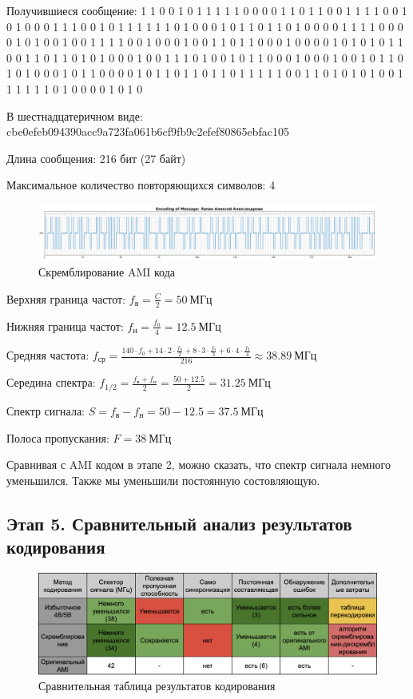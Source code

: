 \documentclass[12pt,onecolumn]{article}
\begin{document}
Получившиеся сообщение: 1 1 0 0 1 0 1 1 1 1 1 0 0 0 0 1 1 0 1 1 0 0 1 1 1 1 0 0 1 0 1 0 0 0 1 1 1
0 0 1 0 1 1 1 1 1 1 0 1 0 0 0 1 0 1 1 0 1 1 0 1 0 0 0 0 1 1 1 1 0 0 0 0 1
0 1 0 0 1 0 0 1 1 1 1 0 0 1 0 0 0 1 0 0 1 1 0 1 1 0 0 0 1 0 0 0 0 1 0 1 0
1 0 1 1 0 0 1 1 0 1 1 0 1 0 1 0 0 0 1 0 0 1 1 1 0 1 0 0 1 0 1 1 0 0 0 1 0
0 0 1 0 0 1 0 1 1 0 1 0 1 0 0 0 1 0 1 1 0 0 0 0 1 0 1 1 0 1 1 0 1 1 0 1 1
1 1 1 0 0 1 1 0 1 0 1 0 1 0 0 1 1 1 1 1 1 0 1 0 0 0 0 1 0 1 0

В шестнадцатеричном виде: cbe0efeb094390acc9a723fa061b6cf9fb9c2efef80865ebfac105

Длина сообщения: 216 бит (27 байт)

Максимальное количество повторяющихся символов: 4

\begin{figure}[H]
    \centering
    \includegraphics[width=\textwidth]{image/encoding_3-1.png}
    \caption{Скремблирование AMI кода}
\end{figure}

Верхняя граница частот: $f_{\text{в}} = \frac{C}{2} = 50~ \text{МГц}$

Нижняя граница частот: $f_{\text{н}} = \frac{f_0}{4} = 12.5 ~ \text{МГц}$

Средняя частота: $f_{\text{ср}} = \frac{140\cdot f_0 + 14\cdot 2\cdot \frac{f_0}{2} + 8\cdot3 \cdot \frac{f_0}{3} + 6 \cdot 4 \cdot\frac{f_0}{4}}{216} \approx 38.89~\text{МГц}$

Середина спектра: $f_{1/2} = \frac{f_{\text{в}} + f_{\text{н}}}{2} = \frac{50 + 12.5}{2} = 31.25~\text{МГц}$

Спектр сигнала: $S = f_{\text{в}} - f_{\text{н}} = 50 - 12.5 = 37.5~\text{МГц}$

Полоса пропускания: $F = 38~ \text{МГц}$

Сравнивая с AMI кодом в этапе 2, можно сказать, что спектр сигнала немного уменьшился. Также мы уменьшили постоянную состовляющую.
\subsection{Этап 5. Сравнительный анализ результатов кодирования}

\begin{figure}[H]
    \centering
    \includegraphics[width=\textwidth]{image/table2.png}
    \caption{Сравнительная таблица результатов кодирования}
\end{figure}
\end{document}
